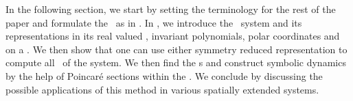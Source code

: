 In the following section, we start by setting the terminology for the rest
of the paper and formulate the \mslices\ as in . In
, we introduce the \twoMode\ system and its representations
in its real valued \statesp , invariant polynomials, polar coordinates and
on a \slice. We then show that one can use either symmetry reduced representation
to compute all \reqva\ of the system. We then find the \rpo s and construct
symbolic dynamics by the help of Poincar\'e sections within the \slice.
We conclude by discussing the possible applications of this method in various
spatially extended systems.
